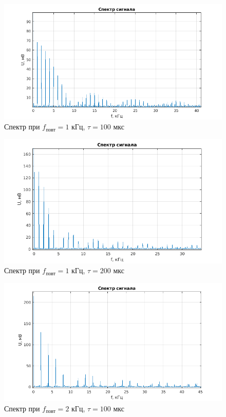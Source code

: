 \documentclass[a4paper, 12pt]{article}%
\begin{document}
\begin{figure}[h!]
    \centering
    \includegraphics[width = 14 cm]{images/1_100_1.png}
    \caption{Спектр при $f_{\text{повт}} = 1$ кГц, $\tau = 100$ мкс}
\end{figure}

\begin{figure}[h!]
    \centering
    \includegraphics[width = 14 cm]{images/1_200_1.png}
    \caption{Спектр при $f_{\text{повт}} = 1$ кГц, $\tau = 200$ мкс}
\end{figure}

\begin{figure}[h!]
    \centering
    \includegraphics[width = 14 cm]{images/1_100_2.png}
    \caption{Спектр при $f_{\text{повт}} = 2$ кГц, $\tau = 100$ мкс}
\end{figure}
\end{document}

